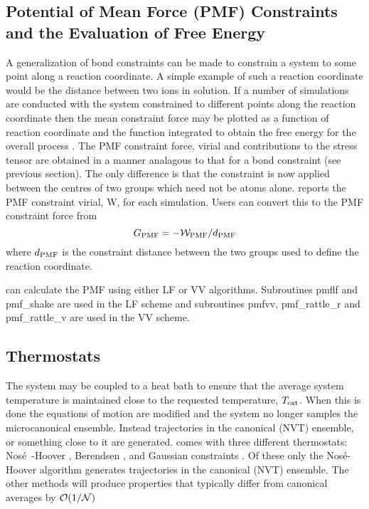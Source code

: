 \subsection{Potential of Mean Force (PMF) Constraints and the Evaluation of Free Energy}
\label{PMF}

A generalization of bond constraints can be made to constrain a system
to some point along a reaction coordinate. A simple example of such a
reaction coordinate would be the distance between two ions in
solution. If a number of simulations are conducted with the system
constrained to different points along the reaction coordinate then the
mean constraint force may be plotted as a function of reaction
coordinate and the function integrated to obtain the free energy for
the overall process \cite{mccammon-87a}.  The PMF constraint force,
virial and contributions to the stress tensor are obtained in a manner
analagous to that for a bond constraint (see previous section). The
only difference is that the constraint is now applied between the
centres of two groups which need not be atoms alone.
\D{} reports the PMF constraint virial, {\cal W}, for each simulation. 
Users can convert this to the PMF constraint force from 
\[ G_{\rm PMF} = - {\cal W}_{\rm PMF} / d_{\rm PMF} \]
where $d_{\rm PMF}$ is the constraint distance between the two groups
used to define the reaction coordinate.

\D{} can calculate the PMF using either LF or VV algorithms.
Subroutines {\sc pmflf} and {\sc pmf\_shake} are used in the LF scheme
and subroutines {\sc pmfvv, pmf\_rattle\_r} and {\sc pmf\_rattle\_v}
are used in the VV scheme.

\subsection{Thermostats}

The system may be coupled to a heat bath to ensure that the average
system temperature is maintained close to the requested temperature,
$T_{\rm ext}$. When this is done the equations of motion are modified
and the system no longer samples the microcanonical
ensemble. Instead trajectories in the canonical
(NVT) ensemble, or something close to it are
generated. \D{} comes with three different thermostats: Nos\'e~-Hoover
\cite{hoover-85a}, Berendsen \cite{berendsen-84a}, and Gaussian
constraints \cite{evans-84a}. Of these
only the Nos\'e-Hoover algorithm generates trajectories in the
canonical (NVT) ensemble. The other methods will produce properties
that typically differ from canonical averages by ${\cal O}(1/{\cal
N})$ \cite{allen-89a}

